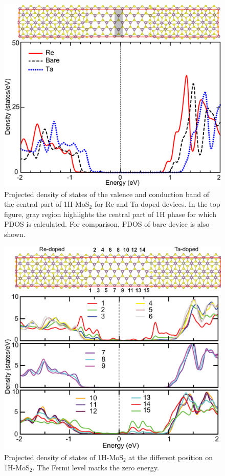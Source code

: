\begin{figure}[htb]
\centering
\includegraphics[width=0.8\linewidth]{Re1-Ta1-Bare.eps}
\caption{\label{re-ta-bare-dos}Projected density of states of the valence and conduction band of the central part of 1H-MoS$_2$ for Re and Ta doped devices. In the top figure, gray region highlights  the central part of 1H phase for which PDOS is calculated.  For comparison, PDOS of bare device is also shown.}
\end{figure}

\begin{figure}[htb]
\centering
\includegraphics[width=0.8\linewidth]{pn-doped.eps}
\caption{\label{pn}Projected density of states of 1H-MoS$_2$ at the different position on 1H-MoS$_2$. 
The Fermi level marks the zero energy.}
\end{figure}

